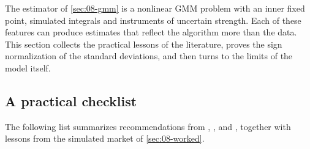 The estimator of \cref{sec:08-gmm} is a nonlinear GMM problem with an inner fixed point, simulated integrals and
instruments of uncertain strength. Each of these features can produce estimates that reflect the algorithm more than the
data. This section collects the practical lessons of the literature, proves the sign normalization of the standard
deviations, and then turns to the limits of the model itself.

\subsection{A practical checklist}\label{sec:08-checklist}

The following list summarizes recommendations from \citet{Nevo2000a}, \citet{DubeFoxSu2012},
\citet{KnittelMetaxoglou2014} and \citet{ConlonGortmaker2020}, together with lessons from the simulated market of
\cref{sec:08-worked}.
